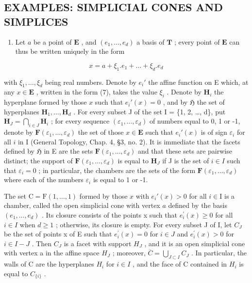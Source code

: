 \subsection{EXAMPLES: SIMPLICIAL CONES AND SIMPLICES}

\begin{enumerate}
\def\labelenumi{\alph{enumi})}
\tightlist
\item
  Let \(a\) be a point of \(\mathbf{E}\) , and \((e_1, \ldots, e_d)\) a basis of \(\mathbf{T}\) ; every point of \(\mathbf{E}\) can thus be written uniquely in the form
\end{enumerate}

\[
x = a + \xi_ {1}. e _ {1} + \dots + \xi_ {d}. e _ {d}\tag{7}
\]

with \(\xi_1, \ldots, \xi_d\) being real numbers. Denote by \(e_i'\) the affine function on E which, at any \(x \in \mathbf{E}\) , written in the form (7), takes the value \(\xi_i\) . Denote by \(\mathbf{H}_i\) the hyperplane formed by those \(x\) such that \(e_i'(x) = 0\) , and by \(\mathfrak{H}\) the set of hyperplanes \(\mathbf{H}_1, \ldots, \mathbf{H}_d\) . For every subset J of the set I = \{1, 2, \ldots, d\}, put \(\mathbf{H}_J = \bigcap_{i \in J} \mathbf{H}_i\) ; for every sequence \((\varepsilon_1, \ldots, \varepsilon_d)\) of numbers equal to 0, 1 or -1, denote by \(\mathbf{F}(\varepsilon_1, \ldots, \varepsilon_d)\) the set of those \(x \in \mathbf{E}\) such that \(e_i'(x)\) is of sign \(\varepsilon_i\) for all \(i\) in I (General Topology, Chap. 4, §3, no. 2). It is immediate that the facets defined by \(\mathfrak{H}\) in E are the sets \(\mathbf{F}(\varepsilon_1, \ldots, \varepsilon_d)\) and that these sets are pairwise distinct; the support of \(\mathbf{F}(\varepsilon_1, \ldots, \varepsilon_d)\) is equal to \(\mathbf{H}_J\) if J is the set of \(i \in I\) such that \(\varepsilon_i = 0\) ; in particular, the chambers are the sets of the form \(\mathbf{F}(\varepsilon_1, \ldots, \varepsilon_d)\) where each of the numbers \(\varepsilon_i\) is equal to 1 or -1.

The set \(\mathrm{C} = \mathrm{F}(1, \ldots, 1)\) formed by those \(x\) with \(e_i'(x) > 0\) for all \(i \in \mathrm{I}\) is a chamber, called the open simplicial cone with vertex \(a\) defined by the basis \((e_{1},\ldots,e_{d})\) . Its closure consists of the points x such that \(e_{i}^{\prime}(x)\geqslant0\) for all \(i\in I\) when \(d\geqslant1\) ; otherwise, its closure is empty. For every subset J of I, let \(C_{J}\) be the set of points x of E such that \(e_{i}^{\prime}(x)=0\) for \(i\in J\) and \(e_{i}^{\prime}(x)>0\) for \(i\in I-J\) . Then \(C_{J}\) is a facet with support \(H_{J}\) , and it is an open simplicial cone with vertex a in the affine space \(H_{J}\) ; moreover, \(\overline{C}=\bigcup_{J\subset I}C_{J}\) . In particular, the walls of C are the hyperplanes \(H_{i}\) for \(i\in I\) , and the face of C contained in \(H_{i}\) is equal to \(C_{\{i\}}\) .

